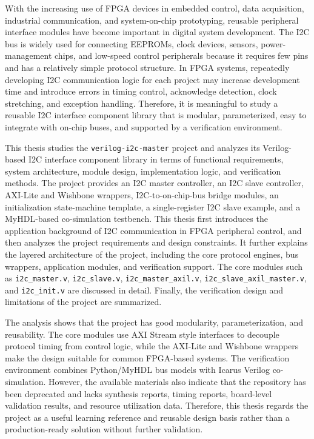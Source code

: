 With the increasing use of FPGA devices in embedded control, data acquisition, industrial communication, and system-on-chip prototyping, reusable peripheral interface modules have become important in digital system development. The I2C bus is widely used for connecting EEPROMs, clock devices, sensors, power-management chips, and low-speed control peripherals because it requires few pins and has a relatively simple protocol structure. In FPGA systems, repeatedly developing I2C communication logic for each project may increase development time and introduce errors in timing control, acknowledge detection, clock stretching, and exception handling. Therefore, it is meaningful to study a reusable I2C interface component library that is modular, parameterized, easy to integrate with on-chip buses, and supported by a verification environment.

This thesis studies the \texttt{verilog-i2c-master} project and analyzes its Verilog-based I2C interface component library in terms of functional requirements, system architecture, module design, implementation logic, and verification methods. The project provides an I2C master controller, an I2C slave controller, AXI-Lite and Wishbone wrappers, I2C-to-on-chip-bus bridge modules, an initialization state-machine template, a single-register I2C slave example, and a MyHDL-based co-simulation testbench. This thesis first introduces the application background of I2C communication in FPGA peripheral control, and then analyzes the project requirements and design constraints. It further explains the layered architecture of the project, including the core protocol engines, bus wrappers, application modules, and verification support. The core modules such as \texttt{i2c\_master.v}, \texttt{i2c\_slave.v}, \texttt{i2c\_master\_axil.v}, \texttt{i2c\_slave\_axil\_master.v}, and \texttt{i2c\_init.v} are discussed in detail. Finally, the verification design and limitations of the project are summarized.

The analysis shows that the project has good modularity, parameterization, and reusability. The core modules use AXI Stream style interfaces to decouple protocol timing from control logic, while the AXI-Lite and Wishbone wrappers make the design suitable for common FPGA-based systems. The verification environment combines Python/MyHDL bus models with Icarus Verilog co-simulation. However, the available materials also indicate that the repository has been deprecated and lacks synthesis reports, timing reports, board-level validation results, and resource utilization data. Therefore, this thesis regards the project as a useful learning reference and reusable design basis rather than a production-ready solution without further validation.

